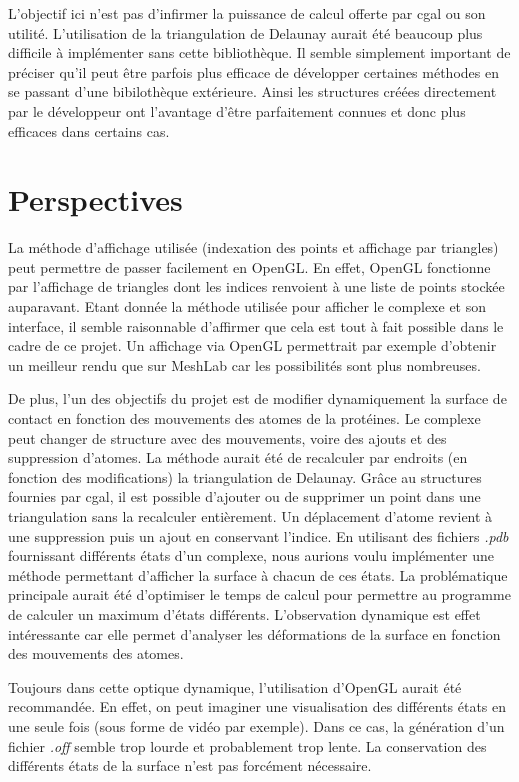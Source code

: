 L'objectif ici n'est pas d'infirmer la puissance de calcul offerte par \gls{cgal} ou son utilité.
L'utilisation de la triangulation de Delaunay aurait été beaucoup plus difficile
à implémenter sans cette bibliothèque. Il semble simplement important de préciser qu'il peut être
parfois plus efficace de développer certaines méthodes en se passant d'une bibilothèque extérieure.
Ainsi les structures créées directement par le développeur ont l'avantage d'être
parfaitement connues et donc plus efficaces dans certains cas.

\section{Perspectives}

La méthode d'affichage utilisée (indexation des points et affichage par triangles)
peut permettre de passer facilement en OpenGL. En effet, OpenGL fonctionne par l'affichage
de triangles dont les indices renvoient à une liste de points stockée auparavant.
Etant donnée la méthode utilisée pour afficher le complexe et son interface, il semble
raisonnable d'affirmer que cela est tout à fait possible dans le cadre de ce projet.
Un affichage via OpenGL permettrait par exemple d'obtenir un meilleur rendu que sur
MeshLab car les possibilités sont plus nombreuses.

De plus, l'un des objectifs du projet est de modifier dynamiquement la surface de contact
en fonction des mouvements des atomes de la protéines. Le complexe peut changer de structure
avec des mouvements, voire des ajouts et des suppression d'atomes. La méthode aurait été
de recalculer par endroits (en fonction des modifications) la triangulation de Delaunay.
Grâce au structures fournies par \gls{cgal}, il est possible d'ajouter ou de supprimer
un point dans une triangulation sans la recalculer entièrement. Un déplacement d'atome
revient à une suppression puis un ajout en conservant l'indice. En utilisant des fichiers \textit{.pdb}
fournissant différents états d'un complexe, nous aurions voulu implémenter une méthode
permettant d'afficher la surface à chacun de ces états. La problématique principale
aurait été d'optimiser le temps de calcul pour permettre au programme de calculer un maximum
d'états différents. L'observation dynamique est effet intéressante car elle permet d'analyser
les déformations de la surface en fonction des mouvements des atomes.

Toujours dans cette optique dynamique, l'utilisation d'OpenGL aurait été recommandée.
En effet, on peut imaginer une visualisation des différents états en une seule fois (sous
forme de vidéo par exemple). Dans ce cas, la génération d'un fichier \textit{.off}
semble trop lourde et probablement trop lente. La conservation des différents états de
la surface n'est pas forcément nécessaire.

